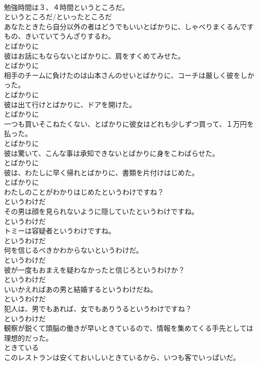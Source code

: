 \documentclass[8pt]{extreport}
\begin{document}
\begin{CJK}{UTF8}{min}
\\	勉強時間は３、４時間というところだ。	
\\	というところだ/といったところだ
\\	あなたときたら自分以外の者はどうでもいいとばかりに、しゃべりまくるんですもの、きいていてうんざりするわ。	
\\	とばかりに
\\	彼はお話にもならないとばかりに、肩をすくめてみせた。	
\\	とばかりに
\\	相手のチームに負けたのは山本さんのせいとばかりに、コーチは厳しく彼をしかった。	
\\	とばかりに
\\	彼は出て行けとばかりに、ドアを開けた。	
\\	とばかりに
\\	一つも買いそこねたくない、とばかりに彼女はどれも少しずつ買って、１万円を払った。	
\\	とばかりに
\\	彼は驚いて、こんな事は承知できないとばかりに身をこわばらせた。	
\\	とばかりに
\\	彼は、わたしに早く帰れとばかりに、書類を片付けはじめた。	
\\	とばかりに
\\	わたしのことがわかりはじめたというわけですね？	
\\	というわけだ
\\	その男は顔を見られないように隠していたというわけですね。	
\\	というわけだ
\\	トミーは容疑者というわけですね。	
\\	というわけだ
\\	何を信じるべきかわからないというわけだ。	
\\	というわけだ
\\	彼が一度もおまえを疑わなかったと信じろというわけか？	
\\	というわけだ
\\	いいかえればあの男と結婚するというわけだね。	
\\	というわけだ
\\	犯人は、男でもあれば、女でもありうるというわけですね？	
\\	というわけだ
\\	観察が鋭くて頭脳の働きが早いときているので、情報を集めてくる手先としては理想的だった。	
\\	ときている
\\	このレストランは安くておいしいときているから、いつも客でいっぱいだ。	

\end{CJK}
\end{document}
